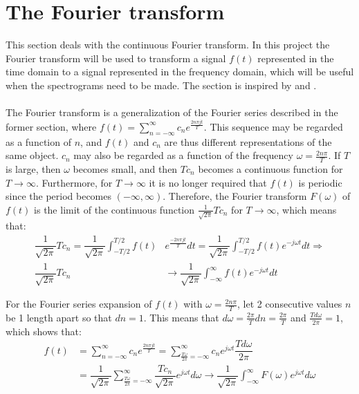\section{The Fourier transform}
This section deals with the continuous Fourier transform. In this project the Fourier transform will be used to transform a signal $f(t)$ represented in the time domain to a signal represented in the frequency domain, which will be useful when the spectrograms need to be made. The section is inspired by \cite{FourierTrans} and \cite{FAA}.
\\ \\
The Fourier transform is a generalization of the Fourier series described in the former section, where $f(t) = \sum_{n=-\infty}^\infty c_n e^{\frac{2n\pi j t}{T}}$. This sequence may be regarded as a function of $n$, and $f(t)$ and $c_n$ are thus different representations of the same object. $c_n$ may also be regarded as a function of the frequency $\omega = \frac{2n\pi}{T}$. If $T$ is large, then $\omega$ becomes small, and then $Tc_n$ becomes a continuous function for $T \to \infty$. Furthermore, for $T \to \infty$ it is no longer required that $f(t)$ is periodic since the period becomes $(-\infty,\infty)$. Therefore, the Fourier transform $F(\omega)$ of $f(t)$ is the limit of the continuous function $\frac{1}{\sqrt{2\pi}} T c_n$ for $T \to \infty$, which means that:
\begin{align*}
\dfrac{1}{\sqrt{2\pi}} T c_n = \dfrac{1}{\sqrt{2\pi}} \int_{-T/2}^{T/2} f(t) &e^{\frac{-2n\pi j t}{T}} dt = \dfrac{1}{\sqrt{2\pi}} \int_{-T/2}^{T/2} f(t) e^{-j\omega t} dt \Rightarrow \\
\dfrac{1}{\sqrt{2\pi}} T c_n &\to \dfrac{1}{\sqrt{2\pi}} \int_{-\infty}^\infty f(t) e^{-j \omega t} dt
\end{align*}

For the Fourier series expansion of $f(t)$ with $\omega = \frac{2n\pi}{T}$, let 2 consecutive values $n$ be 1 length apart so that $dn = 1$. This means that $d\omega = \frac{2\pi}{T} dn = \frac{2\pi}{T}$ and $\frac{T d\omega}{2\pi} = 1$, which shows that:
\begin{align*}
f(t) &= \sum_{n=-\infty}^\infty c_n e^{\frac{2n\pi j t}{T}} = \sum_{\frac{T\omega}{2\pi}=-\infty}^\infty c_n e^{j \omega t} \dfrac{T d\omega}{2 \pi} \\
&= \dfrac{1}{\sqrt{2\pi}} \sum_{\frac{T\omega}{2\pi}=-\infty}^\infty \dfrac{T c_n}{\sqrt{2\pi}} e^{j \omega t} d\omega \to \dfrac{1}{\sqrt{2\pi}} \int_{-\infty}^\infty F(\omega) e^{j \omega t} d \omega
\end{align*}

